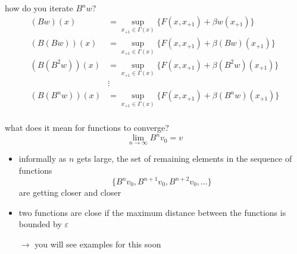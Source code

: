 \documentclass[compress,aspectratio=169]{beamer}
\begin{document}
\begin{frame}
how do you iterate $B^nw$?
\begin{align*}
(Bw)(x) & = \sup_{x_{+1}\in \Gamma(x)} \{F(x,x_{+1})+\beta w(x_{+1}) \} \\
(B(Bw))(x) & = \sup_{x_{+1}\in \Gamma(x)} \{F(x,x_{+1})+\beta (Bw)(x_{+1}) \} \\
(B(B^2w))(x) & = \sup_{x_{+1}\in \Gamma(x)} \{F(x,x_{+1})+\beta (B^2w)(x_{+1}) \} \\ 
& \vdots \\
(B(B^nw))(x) & = \sup_{x_{+1}\in \Gamma(x)} \{F(x,x_{+1})+\beta (B^nw)(x_{+1}) \} \\ 
\end{align*}

\end{frame}

\begin{frame}
what does it mean for functions to converge? 
\begin{displaymath}
\lim_{n\rightarrow \infty} B^nv_0=v
\end{displaymath}
\begin{itemize}
\item informally as $n$ gets large, the set of remaining elements in the sequence of functions
\begin{displaymath}
\{ B^nv_0, B^{n+1}v_0, B^{n+2}v_0, \ldots \}
\end{displaymath}
are getting closer and closer
\vspace{2 mm}
\item two functions are close if the maximum distance between the functions is bounded by $\varepsilon$
\vspace{2 mm}
\item[$\rightarrow$] you will see examples for this soon
\end{itemize}
\end{frame}
\end{document}
